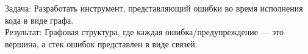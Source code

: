 \item {}
    Задача: Разработать инструмент, представляющий ошибки во время исполнения кода в виде графа.\\
    Результат: Графовая структура, где каждая ошибка/предупреждение --- это вершина, а стек ошибок
    представлен в виде связей.

